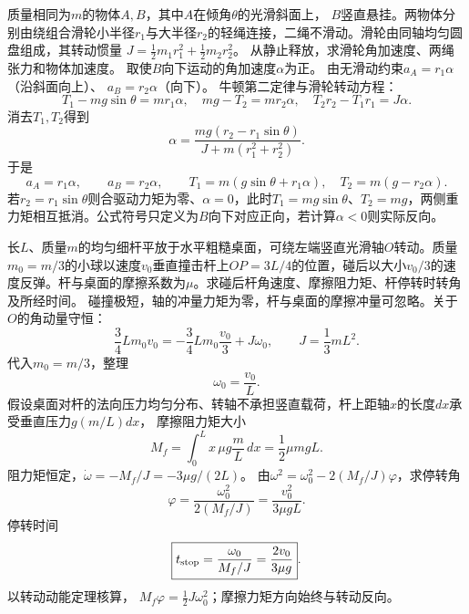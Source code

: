 

\problemtext 质量相同为$m$的物体$A,B$，其中$A$在倾角$\theta$的光滑斜面上，
$B$竖直悬挂。两物体分别由绕组合滑轮小半径$r_1$与大半径$r_2$的轻绳连接，二绳不滑动。滑轮由同轴均匀圆盘组成，其转动惯量
$J=\frac12m_1r_1^2+\frac12m_2r_2^2$。
从静止释放，求滑轮角加速度、两绳张力和物体加速度。
\workings
取使$B$向下运动的角加速度$\alpha$为正。
由无滑动约束$a_A=r_1\alpha$（沿斜面向上）、
$a_B=r_2\alpha$（向下）。
牛顿第二定律与滑轮转动方程：
\[
T_1-mg\sin\theta=mr_1\alpha,\quad
mg-T_2=mr_2\alpha,\quad
T_2r_2-T_1r_1=J\alpha.
\]
消去$T_1,T_2$得到
\[
\boxed{\alpha=\frac{mg(r_2-r_1\sin\theta)}
{J+m(r_1^2+r_2^2)}}.
\]
于是
\[
\boxed{a_A=r_1\alpha,\qquad a_B=r_2\alpha},\qquad
\boxed{T_1=m(g\sin\theta+r_1\alpha),\quad
T_2=m(g-r_2\alpha)}.
\]
\crosscheck 若$r_2=r_1\sin\theta$则合驱动力矩为零、$\alpha=0$，此时$T_1=mg\sin\theta$、$T_2=mg$，两侧重力矩相互抵消。公式符号只定义为$B$向下对应正向，若计算$\alpha<0$则实际反向。

\problemtext 长$L$、质量$m$的均匀细杆平放于水平粗糙桌面，可绕左端竖直光滑轴$O$转动。质量$m_0=m/3$的小球以速度$v_0$垂直撞击杆上$OP=3L/4$的位置，碰后以大小$v_0/3$的速度反弹。杆与桌面的摩擦系数为$\mu$。求碰后杆角速度、摩擦阻力矩、杆停转时转角及所经时间。
\workings
碰撞极短，轴的冲量力矩为零，杆与桌面的摩擦冲量可忽略。关于$O$的角动量守恒：
\[
\frac34Lm_0v_0=-\frac34Lm_0\frac{v_0}{3}+J\omega_0,
\qquad J=\frac13mL^2.
\]
代入$m_0=m/3$，整理
\[
\boxed{\omega_0=\frac{v_0}{L}}.
\]
假设桌面对杆的法向压力均匀分布、转轴不承担竖直载荷，杆上距轴$x$的长度$dx$承受垂直压力$g(m/L)dx$，
摩擦阻力矩大小
\[
\boxed{M_f=\int_0^L x\,\mu g\frac mL\,dx
=\frac12\mu mgL}.
\]
阻力矩恒定，$\dot\omega=-M_f/J=-3\mu g/(2L)$。
由$\omega^2=\omega_0^2-2(M_f/J)\varphi$，求停转角
\[
\boxed{\varphi=\frac{\omega_0^2}{2(M_f/J)}
=\frac{v_0^2}{3\mu gL}}.
\]
停转时间
\[
\boxed{t_{\rm stop}=\frac{\omega_0}{M_f/J}
=\frac{2v_0}{3\mu g}}.
\]
\crosscheck 以转动动能定理核算，
$M_f\varphi=\tfrac12J\omega_0^2$；摩擦力矩方向始终与转动反向。

